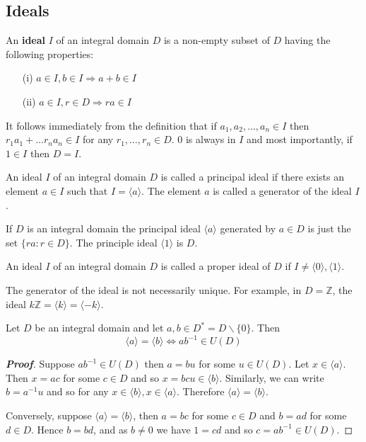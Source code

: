 \subsection{Ideals}
\begin{definition} An {\bf ideal} $I$ of an integral domain $D$ is a non-empty subset of $D$ having the following properties:
\begin{enumerate}
\item[(i)] $a \in I, b \in I \Rightarrow a+b \in I$
\item[(ii)] $a \in I, r \in D \Rightarrow ra \in I$
\end{enumerate}
\end{definition}
It follows immediately from the definition that if $a_1,a_2,\ldots,a_n \in I$ then
$r_1a_1+\ldots r_na_n \in I$ for any $r_1,\ldots,r_n \in D$. $0$ is always in $I$ and most importantly,
if $1 \in I$ then $D=I$.
\begin{definition} An ideal $I$ of an integral domain $D$ is called a principal ideal if there exists an element $a \in I$ such that $I=\langle a \rangle$. The element $a$ is called a generator of the ideal $I$.
\end{definition}
If $D$ is an integral domain the principal ideal $\langle a \rangle$ generated by $a \in D$ is just the set $\{ra: r \in D\}$. The principle ideal $\langle 1 \rangle$ is $D$.
\begin{definition} An ideal $I$ of an integral domain $D$ is called a proper ideal of $D$ if $I \neq \langle 0 \rangle, \langle 1 \rangle$.
\end{definition}
\begin{remark}
The generator of the ideal is not necessarily unique. For example, in $D=\mathbb{Z}$, the ideal
$k\mathbb{Z}=\langle k \rangle=\langle -k \rangle$.
\end{remark}
\begin{theorem} Let $D$ be an integral domain and let $a,b \in D^*=D \backslash \{0\}$. Then
$$\langle a \rangle=\langle b \rangle \iff ab^{-1} \in U(D)$$
\end{theorem}
\begin{proof}[\bf Proof] Suppose $ab^{-1} \in U(D)$ then $a=bu$ for some $u \in U(D)$. Let $x \in \langle a\rangle$. Then $x=ac$ for some $c \in D$ and so $x=bcu \in \langle b \rangle$. Similarly,  we can write $b=a^{-1}u$ and so
for any $x \in \langle b \rangle, x \in \langle a \rangle$. Therefore $\langle a \rangle =\langle b \rangle$.

Conversely, suppose $\langle a \rangle = \langle b \rangle$, then $a=bc$ for some $c \in D$ and $b=ad$ for some $d \in D$. Hence $b=bd$, and as $b \neq 0$ we have $1=cd$ and so $c=ab^{-1} \in U(D)$.
\end{proof}

